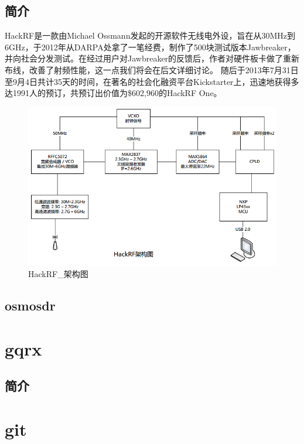 	\subsection{简介}
	\par HackRF是一款由Michael Ossmann发起的开源软件无线电外设，旨在从30MHz到6GHz，于2012年从DARPA处拿了一笔经费，制作了500块测试版本Jawbreaker，并向社会分发测试。在经过用户对Jawbreaker的反馈后，作者对硬件板卡做了重新布线，改善了射频性能，这一点我们将会在后文详细讨论。 随后于2013年7月31日至9月4日共计35天的时间，在著名的社会化融资平台Kickstarter上，迅速地获得多达1991人的预订，共预订出价值为\$602,960的HackRF One。
	\begin{figure}[htb]
	\centering
	\includegraphics{figures/HackRF_架构.png}
	\caption{
		HackRF\_架构图
	}
	\label{fig:example}
	\end{figure}
	\subsection{osmosdr}
\section{gqrx}
	\subsection{简介}
\section{git}
